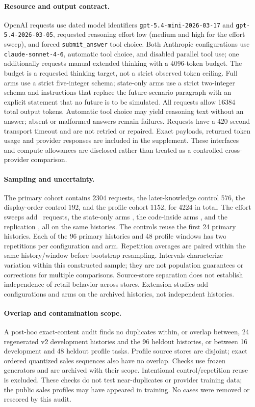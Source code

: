 \paragraph{Resource and output contract.}
OpenAI requests use dated model identifiers
\texttt{gpt-5.4-mini-2026-03-17} and \texttt{gpt-5.4-2026-03-05}, requested
reasoning effort low (medium and high for the effort sweep), and forced
\texttt{submit\_answer} tool choice. Both Anthropic configurations use
\texttt{claude-sonnet-4-6}, automatic tool choice, and disabled parallel tool use;
one additionally requests manual extended thinking with a 4096-token budget. The
budget is a requested thinking target, not a strict observed token ceiling. Full
arms use a strict five-integer schema; state-only arms use a strict two-integer
schema and instructions that replace the future-scenario paragraph with an explicit
statement that no future is to be simulated. All requests allow 16384 total output
tokens. Automatic tool choice may yield reasoning text without an answer; absent or
malformed answers remain failures. Requests have a 420-second transport timeout and
are not retried or repaired. Exact payloads, returned token usage and provider
responses are included in the supplement. These interfaces and compute allowances
are disclosed rather than treated as a controlled cross-provider comparison.

\paragraph{Sampling and uncertainty.}
The primary cohort contains 2304 requests, the later-knowledge control 576,
the display-order control 192, and the profile cohort 1152, for 4224 in total.
The effort sweeps add \EffortRequests\ requests, the state-only arms \StateRequests, the
code-inside arms \ToolRequests, and the replication \ReplicationRequests, all on the same histories. The controls reuse the first 24 primary
histories. Each of the 96 primary histories and 48 profile windows has two
repetitions per configuration and arm. Repetition averages are paired within the
same history/window before bootstrap resampling. Intervals characterize variation
within this constructed sample; they are not population guarantees or corrections
for multiple comparisons. Source-store separation does not establish independence
of retail behavior across stores. Extension studies add configurations and arms on
the archived histories, not independent histories.

\paragraph{Overlap and contamination scope.}
A post-hoc exact-content audit finds no duplicates within, or overlap between,
24 regenerated v2 development histories and the 96 heldout histories, or between
16 development and 48 heldout profile tasks. Profile source stores are disjoint;
exact ordered quantized sales sequences also have no overlap. Checks use frozen
generators and are archived with their scope. Intentional control/repetition
reuse is excluded. These checks do not test near-duplicates or provider training
data; the public sales profiles may have appeared in training. No cases were
removed or rescored by this audit.

